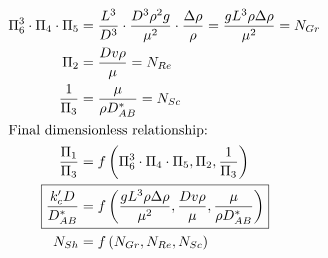 \documentclass[12pt]{article}
\begin{document}
\begin{enumerate}
\begin{align*}
        \Pi_6^3 \cdot \Pi_4 \cdot \Pi_5 &= \frac{L^3}{D^3} \cdot \frac{D^3 \rho^2 g}{\mu^2} \cdot \frac{\Delta\rho}{\rho} = \frac{g L^3 \rho \Delta \rho}{\mu^2} = N_{Gr} \\
        \Pi_2 &= \frac{D v \rho}{\mu} = N_{Re} \\
        \frac{1}{\Pi_3} &= \frac{\mu}{\rho D_{AB}^*} = N_{Sc} \\
        \intertext{Final dimensionless relationship:}
        \frac{\Pi_1}{\Pi_3} &= f\left( \Pi_6^3 \cdot \Pi_4 \cdot \Pi_5, \Pi_2, \frac{1}{\Pi_3} \right) \\
        \Aboxed{\frac{k_c' D}{D_{AB}^*} &= f\left( \frac{g L^3 \rho \Delta \rho}{\mu^2}, \frac{D v \rho}{\mu}, \frac{\mu}{\rho D_{AB}^*} \right)} \\
        N_{Sh} &= f\left( N_{Gr}, N_{Re}, N_{Sc} \right)
    \end{align*}

\end{enumerate}
\end{document}

